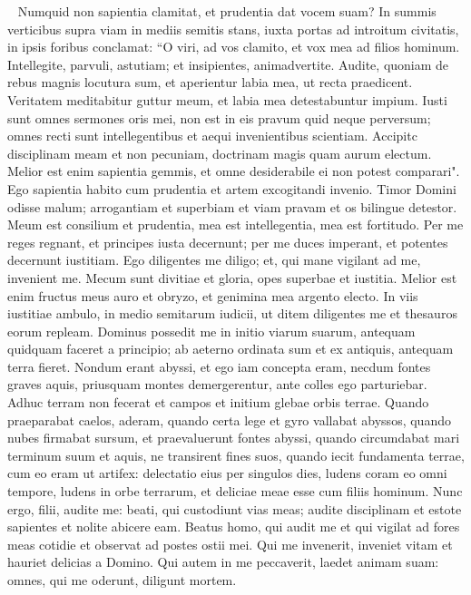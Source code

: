 \begin{biblechapter}   
\verse Numquid non sapientia clamitat, et prudentia dat vocem suam? 
\verse In summis verticibus supra viam in mediis semitis stans, 
\verse iuxta portas ad introitum civitatis, in ipsis foribus conclamat: 
\verse “O viri, ad vos clamito, et vox mea ad filios hominum. 
\verse Intellegite, parvuli, astutiam; et insipientes, animadvertite. 
\verse Audite, quoniam de rebus magnis locutura sum, et aperientur labia mea, ut recta praedicent. 
\verse Veritatem meditabitur guttur meum, et labia mea detestabuntur impium. 
\verse Iusti sunt omnes sermones oris mei, non est in eis pravum quid neque perversum; 
\verse omnes recti sunt intellegentibus et aequi invenientibus scientiam. 
\verse Accipitc disciplinam meam et non pecuniam, doctrinam magis quam aurum electum. 
\verse Melior est enim sapientia gemmis, et omne desiderabile ei non potest comparari". 
\verse Ego sapientia habito cum prudentia et artem excogitandi invenio. 
\verse Timor Domini odisse malum; arrogantiam et superbiam et viam pravam et os bilingue detestor. 
\verse Meum est consilium et prudentia, mea est intellegentia, mea est fortitudo. 
\verse Per me reges regnant, et principes iusta decernunt; 
\verse per me duces imperant, et potentes decernunt iustitiam. 
\verse Ego diligentes me diligo; et, qui mane vigilant ad me, invenient me. 
\verse Mecum sunt divitiae et gloria, opes superbae et iustitia. 
\verse Melior est enim fructus meus auro et obryzo, et genimina mea argento electo. 
\verse In viis iustitiae ambulo, in medio semitarum iudicii, 
\verse ut ditem diligentes me et thesauros eorum repleam. 
\verse Dominus possedit me in initio viarum suarum, antequam quidquam faceret a principio; 
\verse ab aeterno ordinata sum et ex antiquis, antequam terra fieret. 
\verse Nondum erant abyssi, et ego iam concepta eram, necdum fontes graves aquis, 
\verse priusquam montes demergerentur, ante colles ego parturiebar. 
\verse Adhuc terram non fecerat et campos et initium glebae orbis terrae. 
\verse Quando praeparabat caelos, aderam, quando certa lege et gyro vallabat abyssos, 
\verse quando nubes firmabat sursum, et praevaluerunt fontes abyssi, 
\verse quando circumdabat mari terminum suum et aquis, ne transirent fines suos, quando iecit fundamenta terrae, 
\verse cum eo eram ut artifex: delectatio eius per singulos dies, ludens coram eo omni tempore, 
\verse ludens in orbe terrarum, et deliciae meae esse cum filiis hominum. 
\verse Nunc ergo, filii, audite me: beati, qui custodiunt vias meas; 
\verse audite disciplinam et estote sapientes et nolite abicere eam. 
\verse Beatus homo, qui audit me et qui vigilat ad fores meas cotidie et observat ad postes ostii mei. 
\verse Qui me invenerit, inveniet vitam et hauriet delicias a Domino. 
\verse Qui autem in me peccaverit, laedet animam suam: omnes, qui me oderunt, diligunt mortem. 
\end{biblechapter}

